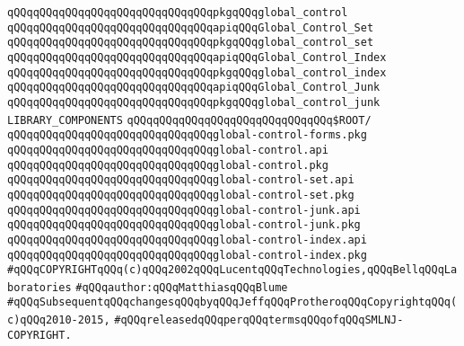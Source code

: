 \verb|qQQqqQQqqQQqqQQqqQQqqQQqqQQqqQQqpkgqQQqglobal_control|\newline
\verb|qQQqqQQqqQQqqQQqqQQqqQQqqQQqqQQqapiqQQqGlobal_Control_Set|\newline
\verb|qQQqqQQqqQQqqQQqqQQqqQQqqQQqqQQqpkgqQQqglobal_control_set|\newline
\verb|qQQqqQQqqQQqqQQqqQQqqQQqqQQqqQQqapiqQQqGlobal_Control_Index|\newline
\verb|qQQqqQQqqQQqqQQqqQQqqQQqqQQqqQQqpkgqQQqglobal_control_index|\newline
\verb|qQQqqQQqqQQqqQQqqQQqqQQqqQQqqQQqapiqQQqGlobal_Control_Junk|\newline
\verb|qQQqqQQqqQQqqQQqqQQqqQQqqQQqqQQqpkgqQQqglobal_control_junk|\newline
\newline
\verb|LIBRARY_COMPONENTS|\newline
\newline
\verb|qQQqqQQqqQQqqQQqqQQqqQQqqQQqqQQq$ROOT/|\newline
\newline
\verb|qQQqqQQqqQQqqQQqqQQqqQQqqQQqqQQqglobal-control-forms.pkg|\newline
\verb|qQQqqQQqqQQqqQQqqQQqqQQqqQQqqQQqglobal-control.api|\newline
\verb|qQQqqQQqqQQqqQQqqQQqqQQqqQQqqQQqglobal-control.pkg|\newline
\verb|qQQqqQQqqQQqqQQqqQQqqQQqqQQqqQQqglobal-control-set.api|\newline
\verb|qQQqqQQqqQQqqQQqqQQqqQQqqQQqqQQqglobal-control-set.pkg|\newline
\verb|qQQqqQQqqQQqqQQqqQQqqQQqqQQqqQQqglobal-control-junk.api|\newline
\verb|qQQqqQQqqQQqqQQqqQQqqQQqqQQqqQQqglobal-control-junk.pkg|\newline
\verb|qQQqqQQqqQQqqQQqqQQqqQQqqQQqqQQqglobal-control-index.api|\newline
\verb|qQQqqQQqqQQqqQQqqQQqqQQqqQQqqQQqglobal-control-index.pkg|\newline
\newline
\newline
\verb|#qQQqCOPYRIGHTqQQq(c)qQQq2002qQQqLucentqQQqTechnologies,qQQqBellqQQqLaboratories|\newline
\verb|#qQQqauthor:qQQqMatthiasqQQqBlume|\newline
\verb|#qQQqSubsequentqQQqchangesqQQqbyqQQqJeffqQQqProtheroqQQqCopyrightqQQq(c)qQQq2010-2015,|\newline
\verb|#qQQqreleasedqQQqperqQQqtermsqQQqofqQQqSMLNJ-COPYRIGHT.|\newline

